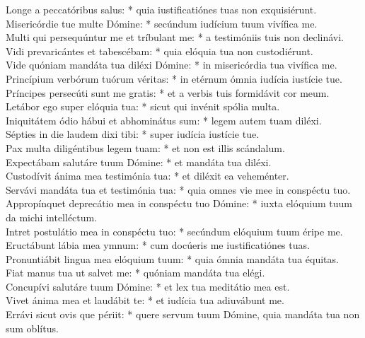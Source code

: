 {	Longe a peccatóribus salus: * quia iustificatiónes tuas non exquisiérunt. \\
	Misericórdie tue multe Dómine: * secúndum iudícium tuum vivífica me. \\
	Multi qui persequúntur me et tríbulant me: * a testimóniis tuis non declinávi. \\
	Vidi prevaricántes et tabescébam: * quia elóquia tua non custodiérunt. \\
	Vide quóniam mandáta tua diléxi Dómine: * in misericórdia tua vivífica me. \\
	Princípium verbórum tuórum véritas: * in etérnum ómnia iudícia iustície tue. \\
	Príncipes persecúti sunt me gratis: * et a verbis tuis formidávit cor meum. \\
	Letábor ego super elóquia tua: * sicut qui invénit spólia multa. \\
	Iniquitátem ódio hábui et abhominátus sum: * legem autem tuam diléxi. \\
	Sépties in die laudem dixi tibi: * super iudícia iustície tue. \\
	Pax multa diligéntibus legem tuam: * et non est illis scándalum. \\
	Expectábam salutáre tuum Dómine: * et mandáta tua diléxi. \\
	Custodívit ánima mea testimónia tua: * et diléxit ea veheménter. \\
	Servávi mandáta tua et testimónia tua: * quia omnes vie mee in conspéctu tuo. \\
	Appropínquet deprecátio mea in conspéctu tuo Dómine: * iuxta elóquium tuum da michi intelléctum. \\
	Intret postulátio mea in conspéctu tuo: * secúndum elóquium tuum éripe me. \\
	Eructábunt lábia mea ymnum: * cum docúeris me iustificatiónes tuas. \\
	Pronuntiábit lingua mea elóquium tuum: * quia ómnia mandáta tua équitas. \\
	Fiat manus tua ut salvet me: * quóniam mandáta tua elégi. \\
	Concupívi salutáre tuum Dómine: * et lex tua meditátio mea est. \\
	Vivet ánima mea et laudábit te: * et iudícia tua adiuvábunt me. \\
	Errávi sicut ovis que périit: * quere servum tuum Dómine, quia mandáta tua non sum oblítus.
}


